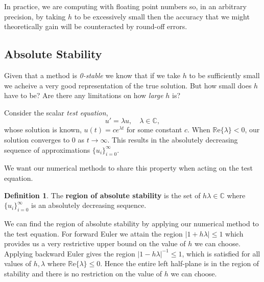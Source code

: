 \documentclass[12pt, twoside]{report}
\theoremstyle{plain}
\theoremstyle{definition}
\newtheorem{definition}{Definition}[chapter]
\theoremstyle{definition}
\providecommand{\abs}[1]{\lvert#1\rvert}
\begin{document}
        In practice, we are computing with floating point numbers so, in an 
        arbitrary precision, by taking $h$ to be excessively small then the 
        accuracy that we might theoretically gain will be counteracted by round-off errors.
        

        \subsection{Absolute Stability}
        \label{2_absolute_stability}
            Given that a method is \textit{0-stable} we know that if we take 
            $h$ to be sufficiently small we acheive a very good representation
            of the true solution. But how small does $h$ have to be? Are there any limitations on how \textit{large} $h$ is?

            Consider the scalar \textit{test equation},
            \begin{equation}
            \label{2_test_equation}
                u' = \lambda u, \quad \lambda \in \mathbb{C},
            \end{equation}
            whose solution is known, $u(t)=c e^{\lambda t}$ for some constant 
            $c$. When $\mathbb{R}\text{e}\{\lambda\} < 0$, our solution 
            converges to 0 as $t\to\infty$. This results in the absolutely 
            decreasing sequence of approximations 
            ${\lbrace u_i \rbrace}_{i=0}^{\infty}$.

            We want our numerical methods to share this property when acting 
            on the test equation.

            \begin{definition}
                The \textbf{region of absolute stability} is the set of 
                $h\lambda\in\mathbb{C}$ where 
                ${\lbrace u_i \rbrace}_{i=0}^{\infty}$ is an absolutely
                decreasing sequence.
            \end{definition}

            We can find the region of absolute stability by applying our 
            numerical method to the test equation. For forward Euler we attain 
            the region $\abs{1+h\lambda} \le 1$ which provides us a very 
            restrictive upper bound on the value of $h$ we can choose. 
            Applying backward Euler gives the region 
            $\abs{1-h\lambda}^{-1} \le 1$, which is satisfied for all values 
            of $h, \lambda$ where $\mathbb{R}\text{e}\{\lambda\} \le 0$.
            Hence the entire left half-plane is in the region of stability and 
            there is no restriction on the value of $h$ we can choose.
\end{document}
